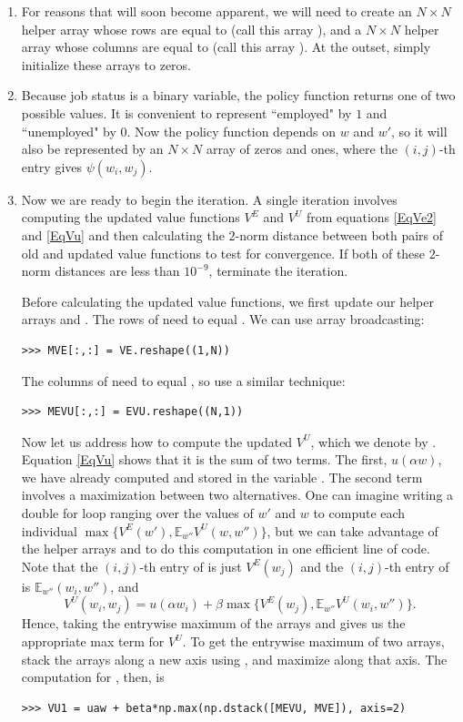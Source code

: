 \begin{problem}
\begin{enumerate}
   \item For reasons that will soon become apparent, we will need to create an $N\times N$ helper array
   whose rows are equal to  (call this array ), and a $N \times N$ helper array whose columns
   are equal to  (call this array ).
   At the outset, simply initialize these arrays to zeros.

   \item Because job status is a binary variable, the policy function returns one of two possible values. It is
   convenient to represent ``employed" by $1$ and ``unemployed" by $0$. Now the policy function depends
   on $w$ and $w'$, so it will also be represented by an $N\times N$ array  of zeros and ones,
   where the $(i,j)$-th entry gives $\psi(w_i, w_j)$.

   \item Now we are ready to begin the iteration.
   A single iteration involves computing the updated value functions $V^E$ and $V^U$ from
   equations \eqref{EqVe2} and \eqref{EqVu} and then calculating the $2$-norm distance between
   both pairs of old and updated value functions to test for convergence. If both of these
   $2$-norm distances are less than $10^{-9}$, terminate the iteration.

   Before calculating the updated value functions, we first update our helper arrays  and
   . The rows of  need to equal . We can use array broadcasting:
\begin{lstlisting}
>>> MVE[:,:] = VE.reshape((1,N))
\end{lstlisting}
   The columns of  need to equal , so use a similar technique:
\begin{lstlisting}
>>> MEVU[:,:] = EVU.reshape((N,1))
\end{lstlisting}

   Now let us address how to compute the updated $V^U$, which we denote by .
   Equation \eqref{EqVu} shows that it is the sum of
   two terms. The first, $u(\alpha w)$, we have already computed and stored in the variable .
   The second term involves a maximization between two alternatives. One can imagine writing
   a double for loop ranging over the values of $w'$ and $w$ to compute each individual
   $\max\{V^E(w'), \mathbb{E}_{w''}V^U(w,w'')\}$, but we can take advantage of the helper
   arrays  and  to do this computation in one efficient line of code.
   Note that the $(i,j)$-th entry of  is just $V^E(w_j)$ and the $(i,j)$-th
   entry of  is $\mathbb{E}_{w''}(w_i, w'')$, and
   \[
   V^U(w_i,w_j) = u(\alpha w_i) + \beta\max\{V^E(w_j), \mathbb{E}_{w''}V^U(w_i,w'')\}.
   \]
   Hence, taking the entrywise maximum of the arrays  and  gives us the appropriate
   max term for $V^U$. To get the entrywise maximum of two arrays, stack the arrays along a new
   axis using , and maximize along that axis. The computation for , then, is
   \begin{lstlisting}
>>> VU1 = uaw + beta*np.max(np.dstack([MEVU, MVE]), axis=2)
   \end{lstlisting}


\end{enumerate}
\end{problem}
